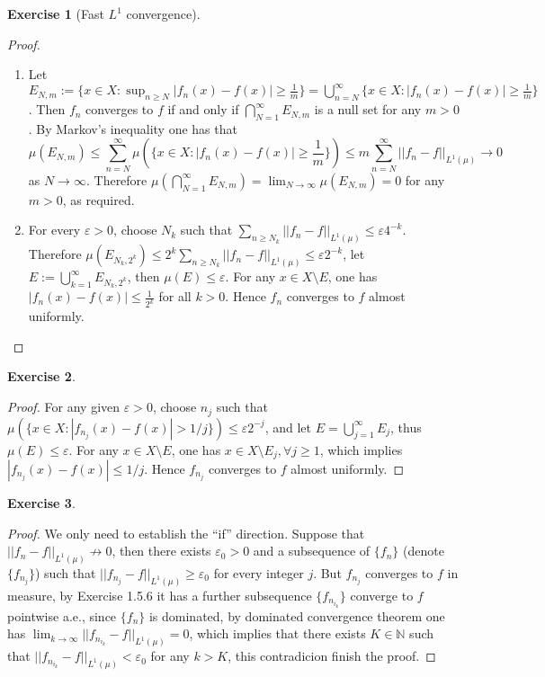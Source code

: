 \documentclass[a4paper]{article}
\newtheorem{ex}{Exercise}[subsection]
\begin{document}
\setcounter{ex}{4}\begin{ex}[Fast $L^1$ convergence]\end{ex}\begin{proof}\ 
\begin{enumerate}[label = (\roman*)]
    \item Let $E_{N, m} := \{x \in X : \sup_{n \geq N} |f_n(x) - f(x)| \geq \frac{1}{m}\} = 
    \bigcup_{n = N}^\infty \{x \in X : |f_n(x) - f(x)| \geq \frac{1}{m}\}$. Then $f_n$ converges to $f$ if and only if 
    $\bigcap_{N = 1}^\infty E_{N, m}$ is a null set for any $m > 0$. By Markov's inequality one has that $$
    \mu(E_{N, m}) \leq \sum_{n = N}^\infty \mu(\{x \in X : |f_n(x) - f(x)| \geq \frac{1}{m}\}) \leq m\sum_{n = N}^\infty
    ||f_n - f||_{L^1(\mu)} \to 0
    $$as $N \to \infty$. Therefore $\mu(\bigcap_{N = 1}^\infty E_{N, m}) = \lim_{N \to \infty} \mu(E_{N, m}) = 0$ for 
    any $m > 0$, as required.
    \item For every $\varepsilon > 0$, choose $N_k$ such that $\sum_{n \geq N_k} ||f_n - f||_{L^1(\mu)} \leq \varepsilon 4^{-k}$.
    Therefore $\mu(E_{N_k, 2^k}) \leq 2^k \sum_{n \geq N_k} ||f_n - f||_{L^1(\mu)} \leq \varepsilon 2^{-k}$, let
    $E := \bigcup_{k = 1}^\infty E_{N_k, 2^k}$, then $\mu(E) \leq \varepsilon$. For any $x \in X \setminus E$, one 
    has $|f_n(x) - f(x)| \leq \frac{1}{2^k}$ for all $k > 0$. Hence $f_n$ converges to $f$ almost uniformly.\qedhere
\end{enumerate}
\end{proof}

\begin{ex}\end{ex}\begin{proof}
For any given $\varepsilon > 0$, choose $n_j$ such that $\mu(\{x \in X : |f_{n_j}(x) - f(x)| > 1/j\}) \leq \varepsilon 2^{-j}$,
and let $E = \bigcup_{j = 1}^\infty E_j$, thus $\mu(E) \leq \varepsilon$. For any $x \in X \setminus E$, one has 
$x \in X \setminus E_j, \forall j \geq 1$, which implies $|f_{n_j}(x) - f(x)| \leq 1/j$. Hence $f_{n_j}$ 
converges to $f$ almost uniformly.
\end{proof}

\setcounter{ex}{9}\begin{ex}\end{ex}
\begin{proof}
We only need to establish the ``if'' direction. Suppose that $||f_n - f||_{L^1(\mu)} \not\to 0$, then there exists 
$\varepsilon_0 > 0$ and a subsequence of $\{f_n\}$ (denote $\{f_{n_j}\}$) such that $||f_{n_j} - f||_{L^1(\mu)} \geq \varepsilon_0$
for every integer $j$. But $f_{n_j}$ converges to $f$ in measure, by Exercise 1.5.6 it has a further subsequence
$\{f_{n_{i_k}}\}$ converge to $f$ pointwise a.e., since $\{f_n\}$ is dominated, by dominated convergence theorem
one has $\lim_{k \to \infty} ||f_{n_{i_k}} - f||_{L^1(\mu)} = 0$, which implies that there exists $K \in \mathbb{N}$
such that $||f_{n_{i_k}} - f||_{L^1(\mu)} < \varepsilon_0$ for any $k > K$, this contradicion finish the proof.
\end{proof}
\end{document}
